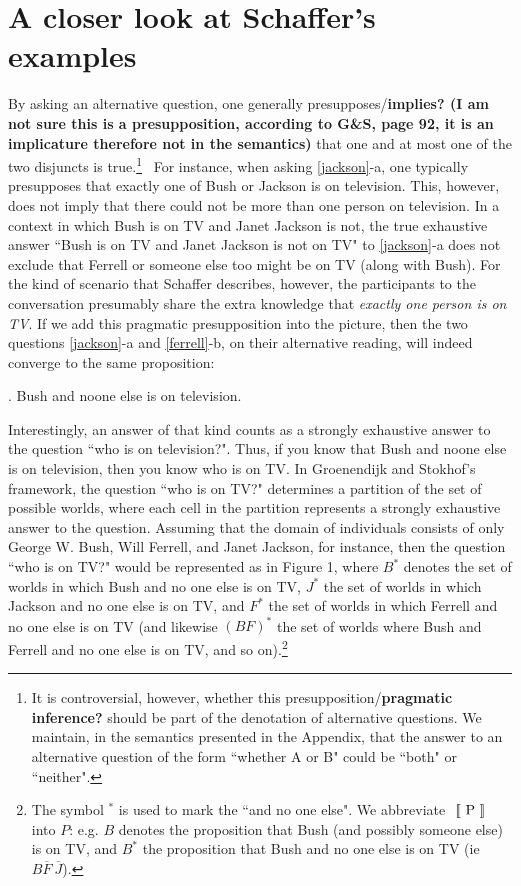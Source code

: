 \section{A closer look at Schaffer's examples}


By asking an alternative question, one generally presupposes/{\bf implies? (I am not sure this is a presupposition, according to G\&S, page 92, it is an implicature  therefore not in the semantics)} that
one and at most one of the two disjuncts is true.\footnote{It is
controversial, however, whether this presupposition/{\bf pragmatic inference?} should be part
of the denotation of alternative questions. We maintain, in the
semantics presented in the Appendix, that the answer to an
alternative question of the form ``whether A or B" could be
``both" or ``neither".} \ For instance, when asking
\ref{jackson}-a, one typically presupposes that exactly one of
Bush or Jackson is on television. This, however, does not imply
that there could not be more than one person on television. In a
context in which Bush is on TV and Janet Jackson is not, the true
exhaustive answer ``Bush is on TV and Janet Jackson is not on TV"
to \ref{jackson}-a does not exclude that Ferrell or someone else
too might be on TV (along with Bush). For the kind of scenario
that Schaffer describes, however, the participants to the
conversation presumably share the extra knowledge that
\emph{exactly one person is on TV}. If we add this pragmatic
presupposition into the picture, then the two questions
\ref{jackson}-a and \ref{ferrell}-b, on their alternative reading,
will indeed converge to the same proposition:

\ex. \label{noone} Bush and noone else is on television.

%

Interestingly, an answer of that kind counts as a strongly
exhaustive answer to the question ``who is on television?". Thus,
if you know that Bush and noone else is on television, then you
know who is on TV. In Groenendijk and Stokhof's framework, the
question ``who is on TV?" determines a partition of the set of
possible worlds, where each cell in the partition represents a
strongly exhaustive answer to the question. Assuming that the
domain of individuals consists of only George W. Bush, Will
Ferrell, and Janet Jackson, for instance, then the question ``who
is on TV?" would be represented as in Figure 1, where $B^{*}$
denotes the set of worlds in which Bush and no one else is on TV,
$J^{*}$ the set of worlds in which Jackson and no one else is on
TV, and $F^{*}$ the set of worlds in which Ferrell and no one else
is on TV (and likewise $(BF)^{*}$ the set of worlds where Bush and
Ferrell and no one else is on TV, and so on).\footnote{The symbol
$^*$ is used to mark the ``and no one else". We abbreviate
$\mbox{ $[\![$ P $]\!]$}$ into $P$: e.g. $B$ denotes the proposition that Bush
(and possibly someone else) is on TV, and $B^{*}$ the proposition
that Bush and no one else is on TV (ie $B \overline{F}\
\overline{J}$).}

